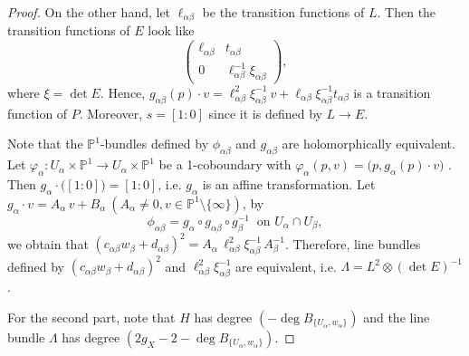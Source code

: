 \documentclass[12pt]{article}
\begin{document}
\begin{proof}
On the other hand,  let $\ell_{\alpha \beta}$ be the transition functions of $L$. Then the transition functions of $E$ look like
\[ \begin{pmatrix}
  \ell_{\alpha \beta} & t_{\alpha \beta} \\
   0 & \ell_{\alpha \beta}^{-1} \xi_{\alpha \beta}
\end{pmatrix}, \]
where $\xi = \det E$. Hence, $g_{\alpha \beta}(p) \cdot v = \ell_{\alpha \beta}^{2} \xi^{-1}_{\alpha \beta} \ v + \ell_{\alpha \beta}\xi^{-1}_{\alpha \beta} t_{\alpha \beta}$ is a transition function of $P$. Moreover, $s = [1:0]$ since it is defined by $L \to E$.

Note that the $\mathbb P^{1}$-bundles defined by $\phi_{\alpha \beta}$ and $g_{\alpha \beta}$ are holomorphically equivalent. Let $\varphi_{\alpha}\colon U_{\alpha} \times \mathbb P^{1} \rightarrow U_{\alpha} \times \mathbb P^{1}$ be a  1-coboundary with $\varphi_{\alpha}(p, v) = \big(p, g_{\alpha}(p) \cdot v \big)$ \cite[p.409]{Atiyah55}. Then $g_{\alpha} \cdot \big( [1:0] \big) = [1:0]$, i.e. $g_{\alpha}$ is an affine transformation. Let $g_{\alpha} \cdot v = A_{\alpha}\, v + B_{\alpha}\ (A_{\alpha} \neq 0, v \in \mathbb P^{1} \setminus \{ \infty \})$, by
\[ \phi_{\alpha \beta} = g_{\alpha} \circ g_{\alpha \beta} \circ g_{\beta}^{-1} \ \text{ on } U_{\alpha} \cap U_{\beta}, \]
we obtain that $(c_{\alpha \beta}w_{\beta} + d_{\alpha \beta})^{2} = A_{\alpha} \, \ell_{\alpha \beta}^{2} \xi^{-1}_{\alpha \beta} \, A_{\beta}^{-1}$. Therefore, line bundles defined by $(c_{\alpha \beta}w_{\beta} + d_{\alpha \beta})^{2}$ and $\ell_{\alpha \beta}^{2} \xi^{-1}_{\alpha \beta}$ are equivalent, i.e. $\Lambda = L^{2} \otimes (\det E)^{-1}$.

For the second part, note that $H$ has degree $\left(-\deg B_{\{U_{\alpha}, w_{\alpha}\}}\right)$ and the line bundle $\Lambda$ has degree $\left(2g_{X} - 2 - \deg B_{\{U_{\alpha}, w_{\alpha}\}}\right)$.


\end{proof}
\end{document}

